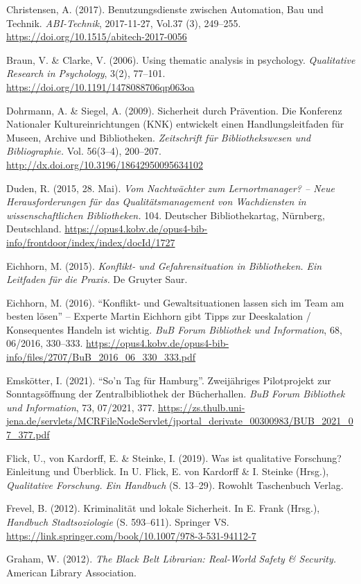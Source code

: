 \documentclass[a4paper,
fontsize=11pt,
oneside,
numbers=noperiodatend,
parskip=half-,
bibliography=totoc,
final
]{scrartcl}
\begin{document}
Christensen, A. (2017). Benutzungsdienste zwischen Automation, Bau und
Technik. \emph{ABI-Technik}, 2017-11-27, Vol.37 (3), 249--255.
\url{https://doi.org/10.1515/abitech-2017-0056}

Braun, V. \& Clarke, V. (2006). Using thematic analysis in psychology.
\emph{Qualitative Research in Psychology}, 3(2), 77--101.
\url{https://doi.org/10.1191/1478088706qp063oa}

Dohrmann, A. \& Siegel, A. (2009). Sicherheit durch Prävention. Die
Konferenz Nationaler Kultureinrichtungen (KNK) entwickelt einen
Handlungsleitfaden für Museen, Archive und Bibliotheken.
\emph{Zeitschrift für Bibliothekswesen und Bibliographie.} Vol.
56(3--4), 200--207. \url{http://dx.doi.org/10.3196/18642950095634102}

Duden, R. (2015, 28. Mai). \emph{Vom Nachtwächter zum Lernortmanager? --
Neue Herausforderungen für das Qualitätsmanagement von Wachdiensten in
wissenschaftlichen Bibliotheken.} 104. Deutscher Bibliothekartag,
Nürnberg, Deutschland.
\url{https://opus4.kobv.de/opus4-bib-info/frontdoor/index/index/docId/1727}

Eichhorn, M. (2015). \emph{Konflikt- und Gefahrensituation in
Bibliotheken. Ein Leitfaden für die Praxis.} De Gruyter Saur.

Eichhorn, M. (2016). \enquote{Konflikt- und Gewaltsituationen lassen
sich im Team am besten lösen} -- Experte Martin Eichhorn gibt Tipps zur
Deeskalation / Konsequentes Handeln ist wichtig. \emph{BuB Forum
Bibliothek und Information}, 68, 06/2016, 330--333.
\url{https://opus4.kobv.de/opus4-bib-info/files/2707/BuB_2016_06_330_333.pdf}

\sloppy
Emskötter, I. (2021). \enquote{So'n Tag für Hamburg}. Zweijähriges
Pilotprojekt zur Sonntagsöffnung der Zentralbibliothek der Bücherhallen.
\emph{BuB Forum Bibliothek und Information}, 73, 07/2021, 377.
\url{https://zs.thulb.uni-jena.de/servlets/MCRFileNodeServlet/jportal_derivate_00300983/BUB_2021_07_377.pdf}

Flick, U., von Kardorff, E. \& Steinke, I. (2019). Was ist qualitative
Forschung? Einleitung und Überblick. In U. Flick, E. von Kardorff \& I.
Steinke (Hrsg.), \emph{Qualitative Forschung. Ein Handbuch} (S. 13--29).
Rowohlt Taschenbuch Verlag.

Frevel, B. (2012). Kriminalität und lokale Sicherheit. In E. Frank
(Hrsg.), \emph{Handbuch Stadtsoziologie} (S. 593--611). Springer VS.
\url{https://link.springer.com/book/10.1007/978-3-531-94112-7}

Graham, W. (2012). \emph{The Black Belt Librarian: Real-World Safety \&
Security.} American Library Association.
\end{document}

